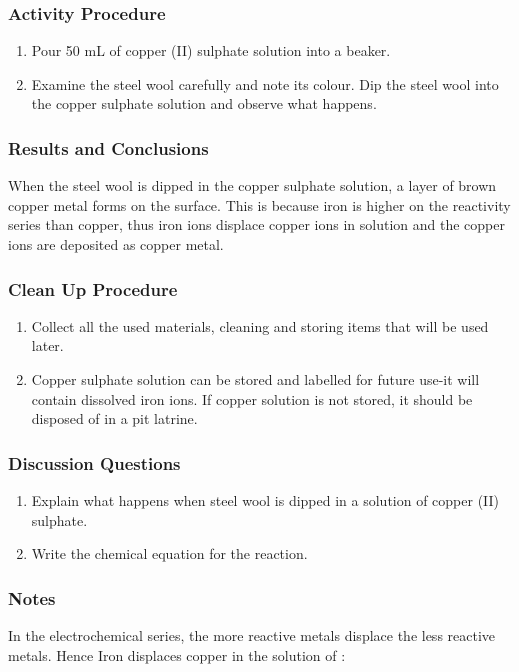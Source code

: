 \subsubsection*{Activity Procedure}
\begin{enumerate}
\item {Pour 50 mL of copper (II) sulphate solution into a beaker.}
\item{Examine the steel wool carefully and note its colour. Dip the steel wool into the copper sulphate solution and observe what happens.}
\end{enumerate}

\subsubsection*{Results and Conclusions}
When the steel wool is dipped in the copper sulphate solution, a layer of brown copper metal forms on the surface. This is because iron is higher on the reactivity series than copper, thus iron ions displace copper ions in solution and the copper ions are deposited as copper metal.

\subsubsection*{Clean Up Procedure}
\begin{enumerate}
\item{Collect all the used materials, cleaning and storing items that will be used later.}
\item{Copper sulphate solution can be stored and labelled for future use-it will contain dissolved iron ions. If copper solution is not stored, it should be disposed of in a pit latrine.}
\end{enumerate}

\subsubsection*{Discussion Questions}
\begin{enumerate}
\item{Explain what happens when steel wool is dipped in a solution of copper (II) sulphate.}
\item{Write the chemical equation for the reaction.}
\end{enumerate}

\subsubsection*{Notes}
In the electrochemical series, the more reactive metals displace the less reactive metals. Hence Iron displaces copper in the solution of :

